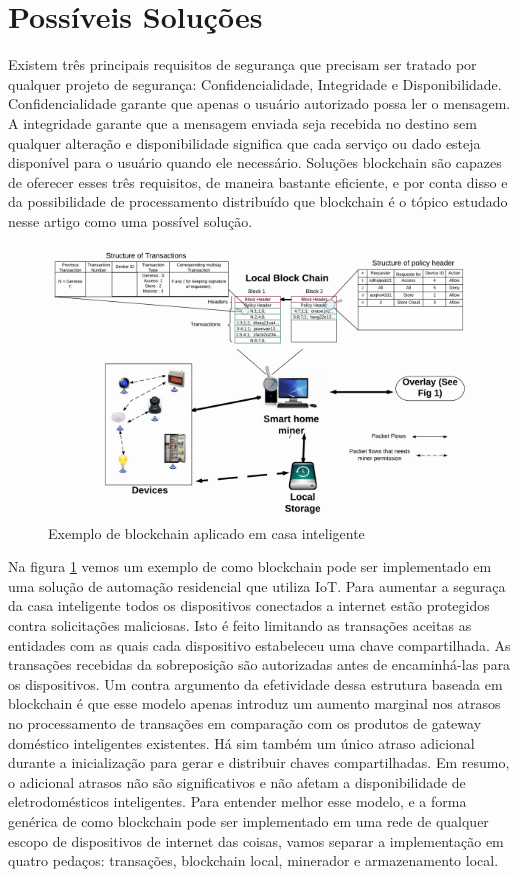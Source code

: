 \section{Possíveis Soluções}

Existem três principais requisitos de segurança que precisam ser tratado por qualquer projeto de segurança: Confidencialidade, Integridade e Disponibilidade. Confidencialidade garante que apenas o usuário autorizado possa ler o mensagem. A integridade garante que a mensagem enviada seja recebida no destino sem qualquer alteração e disponibilidade significa que cada serviço ou dado esteja disponível para o usuário quando ele necessário. Soluções blockchain são capazes de oferecer esses três requisitos, de maneira bastante eficiente, e por conta disso e da possibilidade de processamento distribuído que blockchain é o tópico estudado nesse artigo como uma possível solução.

\begin{figure}[H]
    \centering
    \includegraphics[height=0.5\textwidth]{pictures/home.png}
    \caption{Exemplo de blockchain aplicado em casa inteligente \cite{dorri2017blockchain}}
    \label{fig:home}
\end{figure}

Na figura \ref{fig:home} vemos um exemplo de como blockchain pode ser implementado em uma solução de automação residencial que utiliza IoT. Para aumentar a seguraça da casa inteligente todos os dispositivos conectados a internet estão protegidos contra solicitações maliciosas. Isto é feito limitando as transações aceitas as entidades com as quais cada dispositivo estabeleceu uma chave compartilhada. As transações recebidas da sobreposição são autorizadas antes de encaminhá-las para os dispositivos. Um contra argumento da efetividade dessa estrutura baseada em blockchain é que esse modelo apenas introduz um aumento marginal nos atrasos no processamento de transações em comparação com os produtos de gateway doméstico inteligentes existentes. Há sim também um único atraso adicional durante a inicialização para gerar e distribuir chaves compartilhadas. Em resumo, o adicional atrasos não são significativos e não afetam a disponibilidade de eletrodomésticos inteligentes. Para entender melhor esse modelo, e a forma genérica de como blockchain pode ser implementado em uma rede de qualquer escopo de dispositivos de internet das coisas, vamos separar a implementação em quatro pedaços: transações, blockchain local, minerador e armazenamento local.

